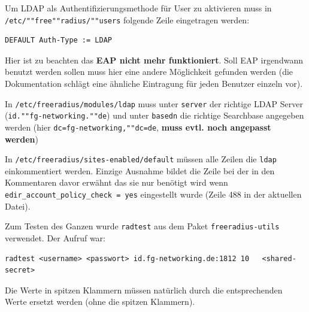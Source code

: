\documentclass[11pt,a4paper,titlepage=firstiscover,headsepline,bibtotoc]{scrartcl} %
\begin{document}
Um LDAP als Authentifizierungsmethode für User zu aktivieren muss in \texttt{/etc/""free""radius/""users} folgende Zeile eingetragen werden:
\begin{lstlisting}
DEFAULT Auth-Type := LDAP
\end{lstlisting}
Hier ist zu beachten das \textbf{EAP nicht mehr funktioniert}. Soll EAP irgendwann benutzt werden sollen muss hier eine andere Möglichkeit gefunden werden (die Dokumentation schlägt eine ähnliche Eintragung für jeden Benutzer einzeln vor).

In \texttt{/etc/freeradius/modules/ldap} muss unter \texttt{server} der richtige LDAP Server (\texttt{id.""fg-networking.""de}) und unter \texttt{basedn} die richtige Searchbase angegeben werden (hier \texttt{dc=fg-networking,""dc=de}, \textbf{muss evtl. noch angepasst werden})

In \texttt{/etc/freeradius/sites-enabled/default} müssen alle Zeilen die \texttt{ldap} einkommentiert werden. Einzige Ausnahme bildet die Zeile bei der in den Kommentaren davor erwähnt das sie nur benötigt wird wenn \texttt{edir\_account\_policy\_check = yes} eingestellt wurde (Zeile 488 in der aktuellen Datei).

Zum Testen des Ganzen wurde \texttt{radtest} aus dem Paket \texttt{freeradius-utils} verwendet. Der Aufruf war:
\begin{lstlisting}
radtest <username> <passwort> id.fg-networking.de:1812 10	<shared-secret>
\end{lstlisting}
Die Werte in spitzen Klammern müssen natürlich durch die entsprechenden Werte ersetzt werden (ohne die spitzen Klammern).


\newpage
\end{document}
